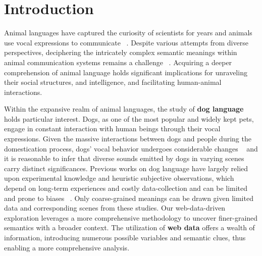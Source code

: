 \section{Introduction}
\label{sec:intro}
Animal languages have captured the curiosity of scientists for years and animals use vocal expressions to communicate ~\cite{garcia2017animal}.
Despite various attempts from diverse perspectives, deciphering the intricately complex semantic meanings within animal communication systems remains a challenge ~\cite{andreas2022towards,scott2023animal}. Acquiring a deeper comprehension of animal language holds significant implications for unraveling their social structures, and intelligence, and facilitating human-animal interactions. 

Within the expansive realm of animal languages, the study of \textbf{dog language} holds particular interest. Dogs, as one of the most popular and widely kept pets, engage in constant interaction with human beings through their vocal expressions.
Given the massive interactions between dogs and people during the domestication process, dogs' vocal behavior undergoes considerable changes ~\cite{jieyiacl2023, feddersen2000vocalization} and it is reasonable to infer that diverse sounds emitted by dogs in varying scenes carry distinct significances. Previous works on dog language have largely relied upon experimental knowledge and heuristic
subjective observations, which depend on long-term experiences and costly data-collection and can be limited and prone to biases ~\cite{yin2002new,pongracz2010barking,farago2017dog}. Only coarse-grained meanings can be drawn given limited data and corresponding scenes from these studies. Our web-data-driven exploration leverages a more comprehensive methodology to uncover finer-grained semantics with a broader context. The utilization of \textbf{web data} offers a wealth of information, introducing numerous possible variables and semantic clues, thus enabling a more comprehensive analysis. 


